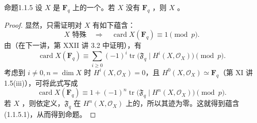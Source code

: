 \begin{SGAresult}{命题}{1.1.5}
设 $X$ 是 $\mathbf F_q$ 上的一个。若 $X$ 没有 $\mathbf F_q$ ，则 $X$ 。
\end{SGAresult}
\begin{proof}
显然，只需证明对 $X$ 有如下蕴含：
\[
 X\text{ 特殊}\quad\Longrightarrow\quad
 \operatorname{card}X(\mathbf F_q)\equiv1\pmod p.
 \tag{1.1.5.1}
\]
由（在下一讲，第 XXII 讲 3.2 中证明），有
\[
 \operatorname{card}X(\mathbf F_q)\equiv
 \sum_{i\geq0}(-1)^i\operatorname{tr}
 \bigl(\mathfrak F_q\mid H^i(X,\mathcal O_X)\bigr)\pmod p.
\]
考虑到 $i\ne0,n=\dim X$ 时 $H^i(X,\mathcal O_X)=0$，且 $H^0(X,\mathcal O_X)\simeq\mathbf F_q$（第 XI 讲 1.5(iii)），可将此式写成
\[
 \operatorname{card}X(\mathbf F_q)\equiv
 1+(-1)^n\operatorname{tr}\bigl(\mathfrak F_q\mid H^n(X,\mathcal O_X)\bigr)\pmod p.
\]
若 $X$ ，则依定义，$\mathfrak F_q$ 在 $H^n(X,\mathcal O_X)$ 上的，所以其迹为零。这就得到蕴含 (1.1.5.1)，从而得到命题。
\end{proof}


